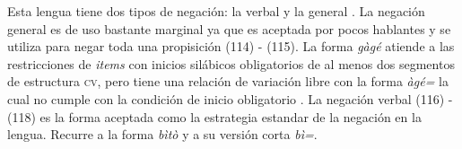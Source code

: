 Esta lengua tiene dos tipos de negación: la verbal y la general \textcolor{MidnightBlue}{\citep{zapoteco}}. La negación general es de uso bastante marginal ya que es aceptada por pocos hablantes y se utiliza para negar toda una propisición (114) - (115). La forma {\setmainfont{Charis SIL} \textit{gàgé}} atiende a las restricciones de \textit{items} con inicios silábicos obligatorios de al menos dos segmentos de estructura \textsc{cv}, pero tiene una relación de variación libre con la forma {\setmainfont{Charis SIL} \textit{àgé=}} la cual no cumple con la condición de inicio obligatorio \textcolor{MidnightBlue}{\citep[pág. 51]{zapoteco}}. La negación verbal (116) - (118) es la forma aceptada como la estrategia estandar de la negación en la lengua. Recurre a la forma {\setmainfont{Charis SIL} \textit{bìtò}} y a su versión corta {\setmainfont{Charis SIL} \textit{bì=}}.

                                                
        